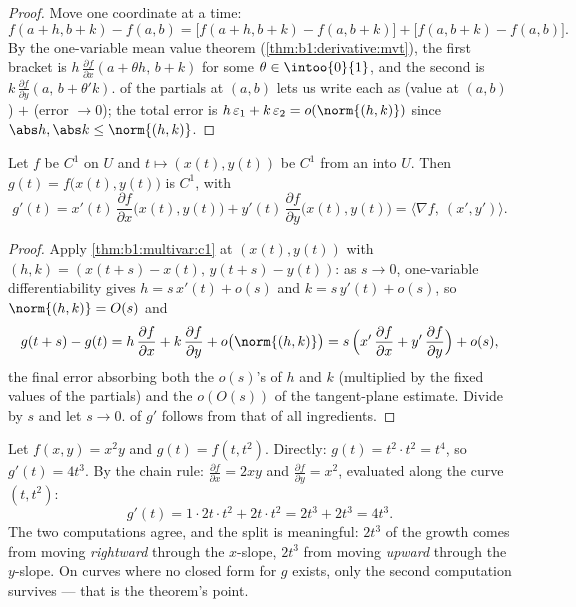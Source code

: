 \begin{proof}
Move one coordinate at a time:
\[
f(a+h, b+k) - f(a,b)
= \bigl[f(a+h, b+k) - f(a, b+k)\bigr] + \bigl[f(a, b+k) -
f(a,b)\bigr].
\]
By the one-variable mean value theorem
(\cref{thm:b1:derivative:mvt}), the first bracket is $h\,
\frac{\partial f}{\partial x}(a + \theta h,\, b + k)$ for some
$\theta \in \intoo{0}{1}$, and the second is $k\,\frac{\partial
f}{\partial y}(a,\, b + \theta' k)$.  of the partials at
$(a,b)$ lets us write each as (value at $(a,b)$) $+$
(error $\to 0$); the total error is $h\,\varepsilon_1 +
k\,\varepsilon_2 = o(\norm{(h,k)})$ since $\abs h, \abs k \leq
\norm{(h,k)}$.
\end{proof}

\begin{theorem}\label{thm:b1:multivar:chain}
Let $f$ be $C^1$ on $U$ and $t \mapsto (x(t), y(t))$ be $C^1$ from
an  into $U$. Then $g(t) = f\bigl(x(t), y(t)\bigr)$ is
$C^1$, with
\[
g'(t) = x'(t)\,\frac{\partial f}{\partial x}\bigl(x(t),y(t)\bigr)
+ y'(t)\,\frac{\partial f}{\partial y}\bigl(x(t),y(t)\bigr)
= \bigl\langle \nabla f,\ (x', y')\bigr\rangle .
\]
\end{theorem}

\begin{proof}
Apply \cref{thm:b1:multivar:c1} at $(x(t), y(t))$ with $(h, k) =
(x(t+s) - x(t),\, y(t+s) - y(t))$: as $s \to 0$, one-variable
differentiability gives $h = s\,x'(t) + o(s)$ and $k = s\,y'(t)
+ o(s)$, so $\norm{(h, k)} = O(s)$ and
\[
g(t+s) - g(t)
= h\,\frac{\partial f}{\partial x} + k\,\frac{\partial
f}{\partial y} + o\bigl(\norm{(h,k)}\bigr)
= s\,\Bigl(x'\,\frac{\partial f}{\partial x} +
y'\,\frac{\partial f}{\partial y}\Bigr) + o(s) ,
\]
the final error absorbing both the $o(s)$'s of $h$ and $k$
(multiplied by the fixed values of the partials) and the
$o(O(s))$ of the tangent-plane estimate. Divide by $s$ and let
$s \to 0$.  of $g'$ follows from that of all
ingredients.
\end{proof}

\begin{example}
\label{ex:b1:multivar:chainrun}
Let $f(x, y) = x^2 y$ and $g(t) = f(t, t^2)$. Directly: $g(t) =
t^2\cdot t^2 = t^4$, so $g'(t) = 4t^3$. By the chain rule:
$\frac{\partial f}{\partial x} = 2xy$ and $\frac{\partial
f}{\partial y} = x^2$, evaluated along the curve $(t, t^2)$:
\[
g'(t) = 1\cdot 2t\cdot t^2 + 2t\cdot t^2 = 2t^3 + 2t^3 = 4t^3 .
\]
The two computations agree, and the split is meaningful: $2t^3$
of the growth comes from moving \emph{rightward} through the
$x$-slope, $2t^3$ from moving \emph{upward} through the
$y$-slope. On curves where no closed form for $g$ exists, only
the second computation survives --- that is the theorem's point.
\end{example}

